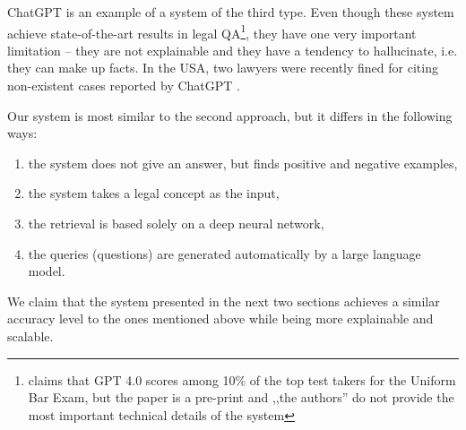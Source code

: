 ChatGPT \cite{chung2022scaling} is an example of a system of the third type. Even though these system achieve 
state-of-the-art results in legal QA\footnote{\cite{openai2023gpt4} claims that GPT 4.0 scores among 10\% of the top test takers 
for the Uniform Bar Exam, but the paper is a pre-print and ,,the authors'' do not provide the most important technical details
of the system}, they have one very important limitation -- they are not explainable and they have a 
tendency to hallucinate, i.e. they can make up facts. In the USA, two lawyers were recently fined for citing non-existent cases
reported by ChatGPT \cite{ap2023lawyers}.

Our system is most similar to the second approach, but it differs in the following ways:
\begin{enumerate}
    \item the system does not give an answer, but finds positive and negative examples,
    \item the system takes a legal concept as the input,
    \item the retrieval is based solely on a deep neural network,
    \item the queries (questions) are generated automatically by a large language model.
\end{enumerate}

We claim that the system presented in the next two sections achieves a similar accuracy level to the ones mentioned above while being more explainable and scalable.

%

